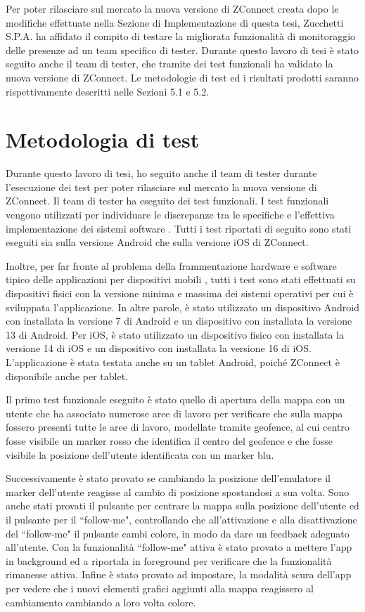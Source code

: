Per poter rilasciare sul mercato la nuova versione di ZConnect creata dopo le modifiche effettuate nella Sezione di Implementazione di questa tesi, Zucchetti S.P.A. ha affidato il compito di testare la migliorata funzionalità di monitoraggio delle presenze ad un team specifico di tester. Durante questo lavoro di tesi è stato seguito anche il team di tester, che tramite dei test funzionali ha validato la nuova versione di ZConnect. Le metodologie di test ed i risultati prodotti saranno rispettivamente descritti nelle Sezioni 5.1 e 5.2.

\section{Metodologia di test}
Durante questo lavoro di tesi, ho seguito anche il team di tester durante l'esecuzione dei test per poter rilasciare sul mercato la nuova versione di ZConnect. Il team di tester ha eseguito dei test funzionali. I test funzionali vengono utilizzati per individuare le discrepanze tra le specifiche e l'effettiva implementazione dei sistemi software \cite{TestFunzionali}. Tutti i test riportati di seguito sono stati eseguiti sia sulla versione Android che sulla versione iOS di ZConnect.

Inoltre, per far fronte al problema della frammentazione hardware e software tipico delle applicazioni per dispositivi mobili \cite{AndroidFragmentation}, tutti i test sono stati effettuati su dispositivi fisici con la versione minima e massima dei sistemi operativi per cui è sviluppata l'applicazione. In altre parole, è stato utilizzato un dispositivo Android con installata la versione 7 di Android e un dispositivo con installata la versione 13 di Android. Per iOS, è stato utilizzato un dispositivo fisico con installata la versione 14 di iOS e un dispositivo con installata la versione 16 di iOS. L'applicazione è stata testata anche su un tablet Android, poiché ZConnect è disponibile anche per tablet.

Il primo test funzionale eseguito è stato quello di apertura della mappa con un utente che ha associato numerose aree di lavoro per verificare che sulla mappa fossero presenti tutte le aree di lavoro, modellate tramite geofence, al cui centro fosse visibile un marker rosso che identifica il centro del geofence e che fosse visibile la posizione dell'utente identificata con un marker blu.

Successivamente è stato provato se cambiando la posizione dell'emulatore il marker dell'utente reagisse al cambio di posizione spostandosi a sua volta. Sono anche stati provati il pulsante per centrare la mappa sulla posizione dell'utente ed il pulsante per il ``follow-me", controllando che all'attivazione e alla disattivazione del ``follow-me" il pulsante cambi colore, in modo da dare un feedback adeguato all'utente. Con la funzionalità ``follow-me" attiva è stato provato a mettere l'app in background ed a riportala in foreground per verificare che la funzionalità rimanesse attiva. Infine è stato provato ad impostare, la modalità scura dell'app per vedere che i nuovi elementi grafici aggiunti alla mappa reagissero al cambiamento cambiando a loro volta colore. 


